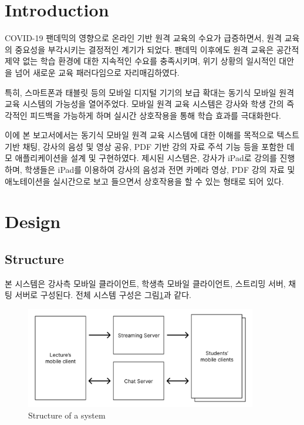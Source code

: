 \documentclass[pdflatex,sn-mathphys-num]{sn-jnl}%
\theoremstyle{thmstyleone}%
\theoremstyle{thmstyletwo}%
\theoremstyle{thmstylethree}%
\begin{document}

\maketitle

\section{Introduction}\label{sec1}

COVID-19 팬데믹의 영향으로 온라인 기반 원격 교육의 수요가 급증하면서, 원격 교육의 중요성을 부각시키는 결정적인 계기가 되었다. 팬데믹 이후에도 원격 교육은 공간적 제약 없는 학습 환경에 대한 지속적인 수요를 충족시키며, 위기 상황의 일시적인 대안을 넘어 새로운 교육 패러다임으로 자리매김하였다.

특히, 스마트폰과 태블릿 등의 모바일 디지털 기기의 보급 확대는 동기식 모바일 원격 교육 시스템의 가능성을 열어주었다. 모바일 원격 교육 시스템은 강사와 학생 간의 즉각적인 피드백을 가능하게 하며 실시간 상호작용을 통해 학습 효과를 극대화한다.

이에 본 보고서에서는 동기식 모바일 원격 교육 시스템에 대한 이해를 목적으로 텍스트 기반 채팅, 강사의 음성 및 영상 공유, PDF 기반 강의 자료 주석 기능 등을 포함한 데모 애플리케이션을 설계 및 구현하였다. 제시된 시스템은, 강사가 iPad로 강의를 진행하며, 학생들은 iPad를 이용하여 강사의 음성과 전면 카메라 영상, PDF 강의 자료 및 애노테이션을 실시간으로 보고 들으면서 상호작용을 할 수 있는 형태로 되어 있다.

\section{Design}\label{sec2}

\subsection{Structure}\label{subsec1}

본 시스템은 강사측 모바일 클라이언트, 학생측 모바일 클라이언트, 스트리밍 서버, 채팅 서버로 구성된다. 전체 시스템 구성은 그림\ref{fig1}과 같다.

\begin{figure}[h]
\centering
\includegraphics[width=0.9\textwidth]{architecture_of_system.png}
\caption{Structure of a system}\label{fig1}
\end{figure}
\end{document}

